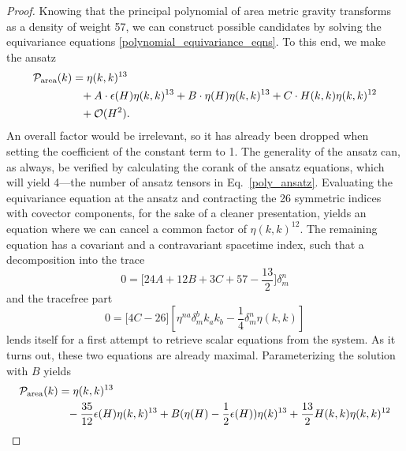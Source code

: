 \begin{proof}
  Knowing that the principal polynomial of area metric gravity transforms as a density of weight 57, we can construct possible candidates by solving the equivariance equations \eqref{polynomial_equivariance_eqns}. To this end, we make the ansatz
  \begin{equation}\label{poly_ansatz}
    \begin{aligned}
      \mathcal P_\text{area}(k) &{} = \eta(k,k)^{13} \\
                                &{} \hphantom{=} + A\cdot \epsilon(H) \eta(k,k)^{13} + B\cdot \eta(H) \eta(k,k)^{13} + C\cdot H(k,k)\eta(k,k)^{12} \\
                                &{} \hphantom{=} + \mathcal O(H^2).
    \end{aligned}
  \end{equation}
An overall factor would be irrelevant, so it has already been dropped when setting the coefficient of the constant term to 1. The generality of the ansatz can, as always, be verified by calculating the corank of the ansatz equations, which will yield 4---the number of ansatz tensors in Eq.~\eqref{poly_ansatz}. Evaluating the equivariance equation at the ansatz and contracting the 26 symmetric indices with covector components, for the sake of a cleaner presentation, yields an equation where we can cancel a common factor of $\eta(k,k)^{12}$. The remaining equation has a covariant and a contravariant spacetime index, such that a decomposition into the trace
\begin{equation}
  0 = \lbrack 24 A + 12 B + 3 C + 57 - \frac{13}{2}\rbrack \delta^n_m
\end{equation}
and the tracefree part
\begin{equation}
  0 = \lbrack 4 C - 26\rbrack [\eta^{na}\delta^b_m k_a k_b - \frac{1}{4} \delta^n_m\eta(k,k)]
\end{equation}
lends itself for a first attempt to retrieve scalar equations from the system. As it turns out, these two equations are already maximal. Parameterizing the solution with $B$ yields
\begin{equation}\label{general_area_metric_gravity_poly}
  \begin{aligned}
    \mathcal P_\text{area}(k) &{} = \eta(k,k)^{13} \\
                              &{} \hphantom{=} - \frac{35}{12} \epsilon(H)\eta(k,k)^{13} + B(\eta(H)-\frac{1}{2}\epsilon(H))\eta(k)^{13} + \frac{13}{2} H(k,k)\eta(k,k)^{12} \\ 

\end{aligned}
\end{equation}
\end{proof}
